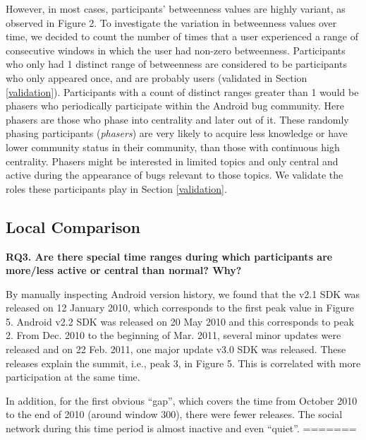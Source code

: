 \documentclass[conference]{IEEEtran}
\begin{document}
However, in most cases, participants' betweenness values are
highly variant, as observed in Figure 2. 
To investigate the variation in betweenness values over time, we
decided to count the number of times that a user experienced a range of consecutive windows in
which the user had non-zero betweenness.
Participants who only had 1
distinct range of betweenness are considered to be participants who
only appeared once, and are probably users (validated in Section \ref{validation}). 
Participants with a count of distinct ranges
 greater than 1 would be phasers who periodically participate within
 the Android bug
community. Here phasers are those who
phase into centrality and later out of it.
These randomly phasing participants (\emph{phasers}) are very likely to
acquire less knowledge or have lower community status in their
community, than those with continuous high centrality. 
Phasers
might be interested in limited topics and only central and active
during the appearance of bugs relevant to those topics.
We validate the roles these participants play in Section \ref{validation}.

\subsection{Local Comparison}
\label{local}

\textbf{RQ3. Are there special time ranges during which participants are more/less active or central than normal? Why?}

By manually inspecting Android version history, we found that the v2.1
SDK was released on 12 January 2010, which corresponds to the first peak
value in Figure 5. Android v2.2 SDK was released on 20 May 2010 and this
corresponds to peak 2. From Dec. 2010 to the beginning of Mar. 2011,
several minor updates were released and on 22 Feb. 2011, one major
update v3.0 SDK was released. These releases explain the summit, i.e.,
peak 3, in  Figure 5. This is correlated with more participation at
the same time.

In addition, for the first obvious ``gap'', which covers the time from
October 2010 to the end of 2010 (around window 300), there were fewer
releases. The social network during this time period is almost inactive
and even ``quiet''.
=======
\end{document}
